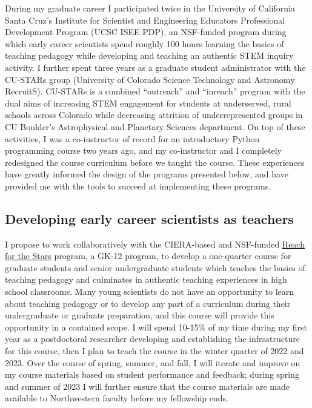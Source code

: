 \documentclass[aasms,11pt, longbibliography]{article}
\begin{document}
During my graduate career I participated twice in the University of California Santa Cruz's Institute for Scientist and Engineering Educators Professional Development Program (UCSC ISEE PDP), an NSF-funded program during which early career scientists spend roughly 100 hours learning the basics of teaching pedagogy while developing and teaching an authentic STEM inquiry activity.
I further spent three years as a graduate student administrator with the CU-STARs group (University of Colorado Science Technology and Astronomy RecruitS).
CU-STARs is a combined ``outreach'' and ``inreach'' program with the dual aims of increasing STEM engagement for students at underserved, rural schools across Colorado while decreasing attrition of underrepresented groups in CU Boulder's Astrophysical and Planetary Sciences department.
On top of these activities, I was a co-instructor of record for an introductory Python programming course two years ago, and my co-instructor and I completely redesigned the course curriculum before we taught the course.
These experiences have greatly informed the design of the programs presented below, and have provided me with the tools to succeed at implementing these programs.

\subsection{Developing early career scientists as teachers}
\label{sct:inquiry_class}
I propose to work collaboratively with the CIERA-based and NSF-funded \href{http://gk12.ciera.northwestern.edu/}{Reach for the Stars} program, a GK-12 program, to develop a one-quarter course for graduate students and senior undergraduate students which teaches the basics of teaching pedagogy and culminates in authentic teaching experiences in high school classrooms.
Many young scientists do not have an opportunity to learn about teaching pedagogy or to develop any part of a curriculum during their undergraduate or graduate preparation, and this course will provide this opportunity in a contained scope.
I will spend 10-15\% of my time during my first year as a postdoctoral researcher developing and establishing the infrastructure for this course, then I plan to teach the course in the winter quarter of 2022 and 2023.
Over the course of spring, summer, and fall, I will iterate and improve on my course materials based on student performance and feedback; during spring and summer of 2023 I will further ensure that the course materials are made available to Northwestern faculty before my fellowship ends.
\end{document}
